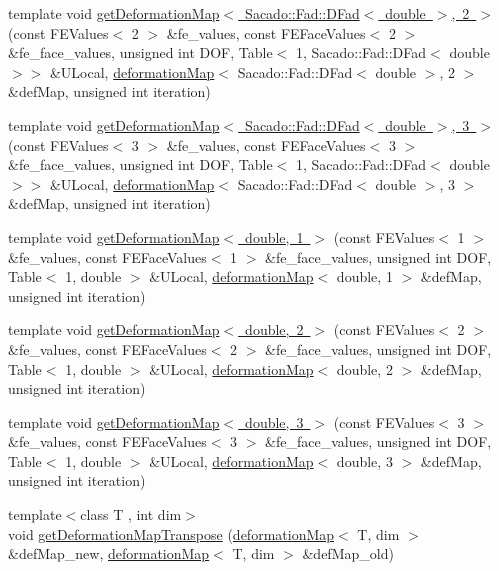 \begin{DoxyCompactItemize}
\item 
template void \mbox{\hyperlink{function_evaluations_8cc_ad11d0f7ed38dbb3358eb93a823679880}{get\+Deformation\+Map$<$ Sacado\+::\+Fad\+::\+D\+Fad$<$ double $>$, 2 $>$}} (const F\+E\+Values$<$ 2 $>$ \&fe\+\_\+values, const F\+E\+Face\+Values$<$ 2 $>$ \&fe\+\_\+face\+\_\+values, unsigned int D\+OF, Table$<$ 1, Sacado\+::\+Fad\+::\+D\+Fad$<$ double $>$$>$ \&U\+Local, \mbox{\hyperlink{structdeformation_map}{deformation\+Map}}$<$ Sacado\+::\+Fad\+::\+D\+Fad$<$ double $>$, 2 $>$ \&def\+Map, unsigned int iteration)
\item 
template void \mbox{\hyperlink{function_evaluations_8cc_a2b4c316f681796502a2308af3aaf6627}{get\+Deformation\+Map$<$ Sacado\+::\+Fad\+::\+D\+Fad$<$ double $>$, 3 $>$}} (const F\+E\+Values$<$ 3 $>$ \&fe\+\_\+values, const F\+E\+Face\+Values$<$ 3 $>$ \&fe\+\_\+face\+\_\+values, unsigned int D\+OF, Table$<$ 1, Sacado\+::\+Fad\+::\+D\+Fad$<$ double $>$$>$ \&U\+Local, \mbox{\hyperlink{structdeformation_map}{deformation\+Map}}$<$ Sacado\+::\+Fad\+::\+D\+Fad$<$ double $>$, 3 $>$ \&def\+Map, unsigned int iteration)
\item 
template void \mbox{\hyperlink{function_evaluations_8cc_a2128b8b5715cb868caf25dc37b818a1d}{get\+Deformation\+Map$<$ double, 1 $>$}} (const F\+E\+Values$<$ 1 $>$ \&fe\+\_\+values, const F\+E\+Face\+Values$<$ 1 $>$ \&fe\+\_\+face\+\_\+values, unsigned int D\+OF, Table$<$ 1, double $>$ \&U\+Local, \mbox{\hyperlink{structdeformation_map}{deformation\+Map}}$<$ double, 1 $>$ \&def\+Map, unsigned int iteration)
\item 
template void \mbox{\hyperlink{function_evaluations_8cc_ad204a932cf153014c52e1c59196fab28}{get\+Deformation\+Map$<$ double, 2 $>$}} (const F\+E\+Values$<$ 2 $>$ \&fe\+\_\+values, const F\+E\+Face\+Values$<$ 2 $>$ \&fe\+\_\+face\+\_\+values, unsigned int D\+OF, Table$<$ 1, double $>$ \&U\+Local, \mbox{\hyperlink{structdeformation_map}{deformation\+Map}}$<$ double, 2 $>$ \&def\+Map, unsigned int iteration)
\item 
template void \mbox{\hyperlink{function_evaluations_8cc_a7c7b5895783c8ab03bd49b2d099a8d36}{get\+Deformation\+Map$<$ double, 3 $>$}} (const F\+E\+Values$<$ 3 $>$ \&fe\+\_\+values, const F\+E\+Face\+Values$<$ 3 $>$ \&fe\+\_\+face\+\_\+values, unsigned int D\+OF, Table$<$ 1, double $>$ \&U\+Local, \mbox{\hyperlink{structdeformation_map}{deformation\+Map}}$<$ double, 3 $>$ \&def\+Map, unsigned int iteration)
\item 
{\footnotesize template$<$class T , int dim$>$ }\\void \mbox{\hyperlink{group___evaluation_functions_gad4003712a2346a79e13bdbfcad4d1e1c}{get\+Deformation\+Map\+Transpose}} (\mbox{\hyperlink{structdeformation_map}{deformation\+Map}}$<$ T, dim $>$ \&def\+Map\+\_\+new, \mbox{\hyperlink{structdeformation_map}{deformation\+Map}}$<$ T, dim $>$ \&def\+Map\+\_\+old)

\end{DoxyCompactItemize}
